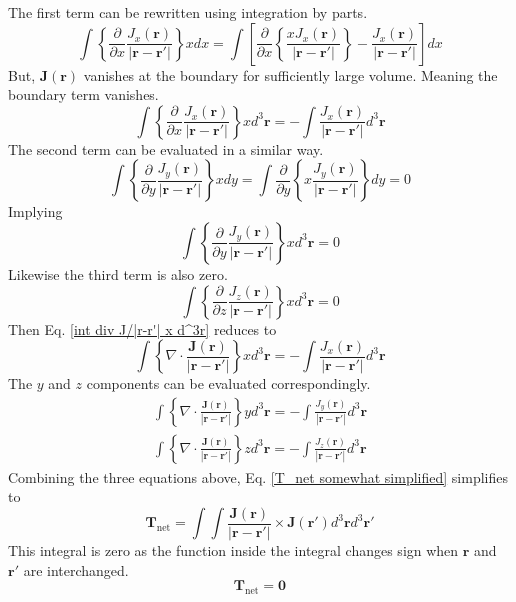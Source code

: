 \documentclass[titlepage, a4paper, 11pt]{article}
\begin{document}
The first term can be rewritten using integration by parts.
\begin{equation}
	\int \left\{ \frac{\partial}{\partial x} \frac{J_x(\mathbf{r})}{|\mathbf{r} - \mathbf{r}'|}
	\right\} x dx = \int \left[ \frac{\partial}{\partial x} \left\{ \frac{xJ_x(\mathbf{r})}{
	|\mathbf{r} - \mathbf{r}'|} \right\} - \frac{J_x(\mathbf{r})}{|\mathbf{r} - \mathbf{r}'|}
	\right] dx
\end{equation}
But, $\mathbf{J}(\mathbf{r})$ vanishes at the boundary for sufficiently large volume. Meaning the
boundary term vanishes.
\begin{equation}
	\int \left\{ \frac{\partial}{\partial x} \frac{J_x(\mathbf{r})}{|\mathbf{r} - \mathbf{r}'|}
	\right\} x d^3\mathbf{r} = - \int \frac{J_x(\mathbf{r})}{|\mathbf{r} - \mathbf{r}'|} d^3
	\mathbf{r}
\end{equation}
The second term can be evaluated in a similar way.
\begin{equation}
	\int \left\{ \frac{\partial}{\partial y} \frac{J_y(\mathbf{r})}{|\mathbf{r} - \mathbf{r}'|}
	\right\} x dy = \int \frac{\partial}{\partial y} \left\{ x \frac{J_y(\mathbf{r})}{|\mathbf{r} -
	\mathbf{r}'|} \right\} dy = 0
\end{equation}
Implying
\begin{equation}
	\int \left\{ \frac{\partial}{\partial y} \frac{J_y(\mathbf{r})}{|\mathbf{r} - \mathbf{r}'|}
	\right\} x d^3 \mathbf{r} = 0
\end{equation}
Likewise the third term is also zero.
\begin{equation}
	\int \left\{ \frac{\partial}{\partial z} \frac{J_z(\mathbf{r})}{|\mathbf{r} - \mathbf{r}'|}
	\right\} x d^3 \mathbf{r} = 0
\end{equation}
Then Eq. \eqref{int div J/|r-r'| x d^3r} reduces to
\begin{equation}
	\int \left\{ \nabla \cdot \frac{\mathbf{J}(\mathbf{r})}{|\mathbf{r} - \mathbf{r}'|} \right\} x
	d^3\mathbf{r} = - \int \frac{J_x(\mathbf{r})}{|\mathbf{r} - \mathbf{r}'|} d^3 \mathbf{r}
\end{equation}
The $y$ and $z$ components can be evaluated correspondingly.
\begin{align}
	\int \left\{ \nabla \cdot \frac{\mathbf{J}(\mathbf{r})}{|\mathbf{r} - \mathbf{r}'|} \right\} y
	d^3\mathbf{r} = - \int \frac{J_y(\mathbf{r})}{|\mathbf{r} - \mathbf{r}'|} d^3 \mathbf{r} \\
	\int \left\{ \nabla \cdot \frac{\mathbf{J}(\mathbf{r})}{|\mathbf{r} - \mathbf{r}'|} \right\} z
	d^3\mathbf{r} = - \int \frac{J_z(\mathbf{r})}{|\mathbf{r} - \mathbf{r}'|} d^3 \mathbf{r}
\end{align}
Combining the three equations above, Eq. \eqref{T_net somewhat simplified} simplifies to
\begin{equation}
	\mathbf{T}_\text{net} = \int \int \frac{\mathbf{J}(\mathbf{r})}{|\mathbf{r} - \mathbf{r}'|} \times
	\mathbf{J}(\mathbf{r}') d^3\mathbf{r} d^3\mathbf{r}'
\end{equation}
This integral is zero as the function inside the integral changes sign when $\mathbf{r}$ and
$\mathbf{r}'$ are interchanged.
\begin{equation}
	\mathbf{T}_\text{net} = \mathbf{0}
\end{equation}
\end{document}
